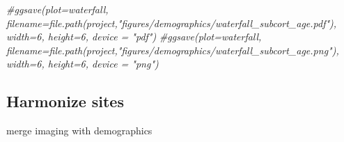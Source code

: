 \documentclass[
]{article}
\newenvironment{Shaded}{\begin{snugshade}}{\end{snugshade}}
\newcommand{\CommentTok}[1]{\textcolor[rgb]{0.56,0.35,0.01}{\textit{#1}}}
\begin{document}
\begin{Shaded}
\begin{Highlighting}[]
\CommentTok{\#ggsave(plot=waterfall, filename=file.path(project,"figures/demographics/waterfall\_subcort\_age.pdf"), width=6, height=6, device = "pdf")}
\CommentTok{\#ggsave(plot=waterfall, filename=file.path(project,"figures/demographics/waterfall\_subcort\_age.png"), width=6, height=6, device = "png")}
\end{Highlighting}
\end{Shaded}

\hypertarget{harmonize-sites}{%
\subsection{Harmonize sites}\label{harmonize-sites}}

merge imaging with demographics
\end{document}

